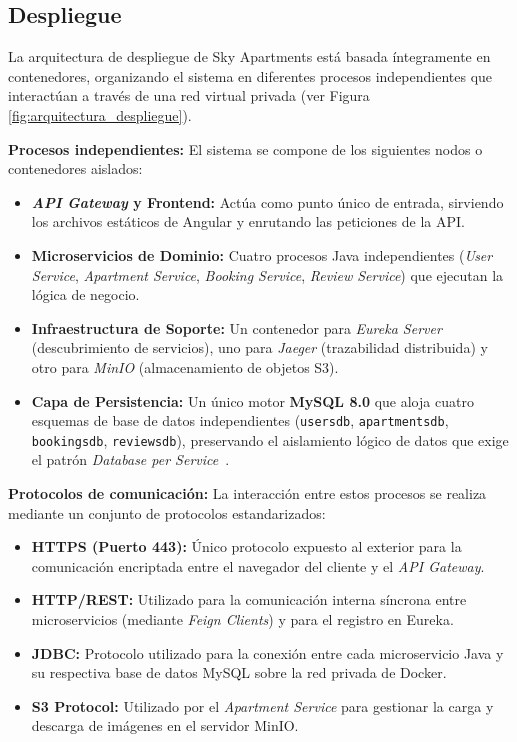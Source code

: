     \subsection{Despliegue}
        La arquitectura de despliegue de Sky Apartments está basada íntegramente en contenedores, organizando el sistema en diferentes procesos independientes que interactúan a través de una red virtual privada (ver Figura \ref{fig:arquitectura_despliegue}). 

        \textbf{Procesos independientes:}
        El sistema se compone de los siguientes nodos o contenedores aislados:
        \begin{itemize}
            \item \textbf{\textit{API Gateway} y Frontend:} Actúa como punto único de entrada, sirviendo los archivos estáticos de Angular y enrutando las peticiones de la API.
            \item \textbf{Microservicios de Dominio:} Cuatro procesos Java independientes (\textit{User Service}, \textit{Apartment Service}, \textit{Booking Service}, \textit{Review Service}) que ejecutan la lógica de negocio.
            \item \textbf{Infraestructura de Soporte:} Un contenedor para \textit{Eureka Server} (descubrimiento de servicios), uno para \textit{Jaeger} (trazabilidad distribuida) y otro para \textit{MinIO} (almacenamiento de objetos S3).
            \item \textbf{Capa de Persistencia:} Un único motor \textbf{MySQL 8.0} que aloja cuatro esquemas de base de datos independientes (\texttt{usersdb}, \texttt{apartmentsdb}, \texttt{bookingsdb}, \texttt{reviewsdb}), preservando el aislamiento lógico de datos que exige el patrón \textit{Database per Service}~\cite[Cap.~5]{richardson2018}.
        \end{itemize}

        \textbf{Protocolos de comunicación:}
        La interacción entre estos procesos se realiza mediante un conjunto de protocolos estandarizados:
        \begin{itemize}
            \item \textbf{HTTPS (Puerto 443):} Único protocolo expuesto al exterior para la comunicación encriptada entre el navegador del cliente y el \textit{API Gateway}.
            \item \textbf{HTTP/REST:} Utilizado para la comunicación interna síncrona entre microservicios (mediante \textit{Feign Clients}) y para el registro en Eureka.
            \item \textbf{JDBC:} Protocolo utilizado para la conexión entre cada microservicio Java y su respectiva base de datos MySQL sobre la red privada de Docker.
            \item \textbf{S3 Protocol:} Utilizado por el \textit{Apartment Service} para gestionar la carga y descarga de imágenes en el servidor MinIO.
        \end{itemize}

